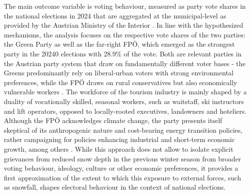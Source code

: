 \documentclass{article}
\begin{document}
The main outcome variable is voting behaviour, measured as party vote shares in the national elections in 2024 that are aggregated at the municipal-level as provided by the Austrian Ministry of the Interior \parencite{bmi2024}. In line with the hypothesized mechanisms, the analysis focuses on the respective vote shares of the two parties: the Green Party as well as the far-right FPÖ, which emerged as the strongest party in the 20240 elections  with 28.9\% of the vote. Both are relevant parties in the Austrian party system that draw on fundamentally different voter bases - the Greens predominantly rely on liberal-urban voters with strong environmental preferences, while the FPÖ draws on rural conservatives but also economically vulnerable workers \parencite{kritzinger2013}. The workforce of the tourism industry is mainly shaped by a duality of vocationally skilled, seasonal workers, such as waitstaff, ski instructors and lift operators, opposed to locally-rooted executives, landowners and hoteliers.  
Although the FPÖ acknowledges climate change, the party presents itself skeptical of its anthropogenic nature and cost-bearing energy transition policies, rather campaigning for policies enhancing industrial and short-term economic growth, among others \parencite{fpoe2024, ennserjedenastik2016}.
While this approach does not allow to isolate explicit grievances from reduced snow depth in the previous winter season from broader voting behaviour, ideology, culture or other economic preferences, it provides a first approximation of the extent to which this exposure to external forces, such as snowfall, shapes electoral behaviour in the context of national elections. 
\end{document}
